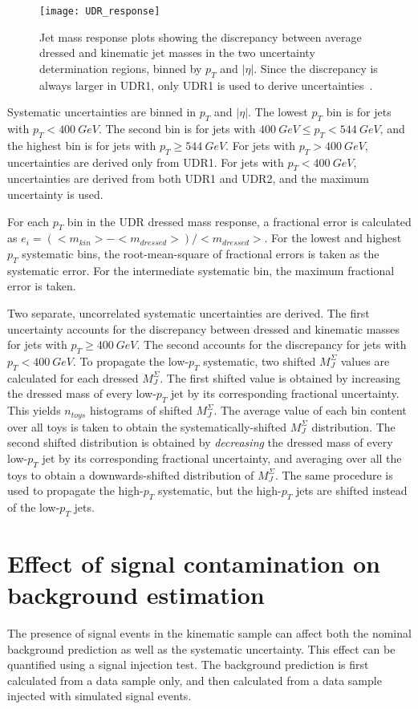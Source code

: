 \begin{figure}[!ht]
    \centering
    \texttt{[image: UDR\_response]}
    \caption{Jet mass response plots showing the discrepancy between average dressed and kinematic jet masses in the two uncertainty
    determination regions, binned by $p_T$ and $|\eta|$.
    Since the discrepancy is always larger in UDR1, only UDR1 is used to derive uncertainties~\cite{paper-plb}.}
    \label{fig:udr_response}
\end{figure}

Systematic uncertainties are binned in $p_{T}$ and $|\eta|$.
The lowest $p_{T}$ bin is for jets with $p_{T} < 400~GeV$.
The second bin is for jets with $400~GeV \leq p_T < 544~GeV$, and the highest bin is for jets with $p_T \geq 544~GeV$.
For jets with $p_{T} > 400~GeV$, uncertainties are derived only from UDR1.
For jets with $p_{T} < 400~GeV$, uncertainties are derived from both UDR1 and UDR2, and the maximum uncertainty is used.

For each $p_T$ bin in the UDR dressed mass response, a fractional error is calculated as $e_i=\left(<m_{kin}>-<m_{dressed}>\right)/<m_{dressed}>$.
For the lowest and highest $p_T$ systematic bins, the root-mean-square of fractional errors is taken as the systematic error.
For the intermediate systematic bin, the maximum fractional error is taken.

Two separate, uncorrelated systematic uncertainties are derived.
The first uncertainty accounts for the discrepancy between dressed and kinematic masses for jets with $p_T \geq 400~GeV$.
The second accounts for the discrepancy for jets with $p_T < 400~GeV$.
To propagate the low-$p_T$ systematic, two shifted $M_{J}^{\Sigma}$ values are calculated for each dressed $M_{J}^{\Sigma}$.
The first shifted value is obtained by increasing the dressed mass of every low-$p_T$ jet by its corresponding fractional uncertainty.
This yields $n_{toys}$ histograms of shifted $M_{J}^{\Sigma}$.
The average value of each bin content over all toys is taken to obtain the systematically-shifted $M_{J}^{\Sigma}$ distribution.
The second shifted distribution is obtained by \textit{decreasing} the dressed mass of every low-$p_T$ jet by its corresponding fractional uncertainty, and averaging over all the toys to obtain a downwards-shifted distribution of $M_{J}^{\Sigma}$.
The same procedure is used to propagate the high-$p_T$ systematic, but the high-$p_T$ jets are shifted instead of the low-$p_T$ jets.

\section{Effect of signal contamination on background estimation}\label{sec:signal_contamination}
The presence of signal events in the kinematic sample can affect both the nominal background prediction as well as the systematic uncertainty.
This effect can be quantified using a signal injection test.
The background prediction is first calculated from a data sample only, and then calculated from a data sample injected with simulated signal events.

